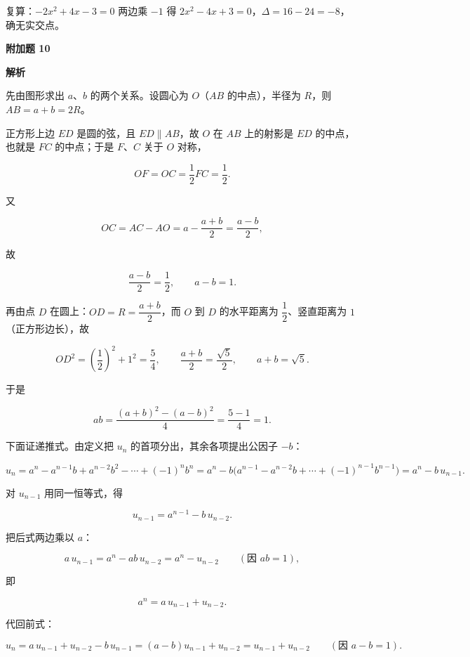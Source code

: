 \begin{answer}
复算：$-2x^2+4x-3=0$ 两边乘 $-1$ 得 $2x^2-4x+3=0$，$\Delta=16-24=-8$，确无实交点。

\textbf{附加题 10}

\textbf{解析}

先由图形求出 $a$、$b$ 的两个关系。设圆心为 $O$（$AB$ 的中点），半径为 $R$，则 $AB=a+b=2R$。

正方形上边 $ED$ 是圆的弦，且 $ED\parallel AB$，故 $O$ 在 $AB$ 上的射影是 $ED$ 的中点，也就是 $FC$ 的中点；于是 $F$、$C$ 关于 $O$ 对称，

\nopagebreak[4]
\[
OF=OC=\frac12 FC=\frac12.
\]

又

\nopagebreak[4]
\[
OC=AC-AO=a-\frac{a+b}{2}=\frac{a-b}{2},
\]

故

\nopagebreak[4]
\[
\frac{a-b}{2}=\frac12,\qquad a-b=1.
\]

再由点 $D$ 在圆上：$OD=R=\dfrac{a+b}{2}$，而 $O$ 到 $D$ 的水平距离为 $\dfrac12$、竖直距离为 $1$（正方形边长），故

\nopagebreak[4]
\[
OD^2=\left(\frac12\right)^2+1^2=\frac54,
\qquad
\frac{a+b}{2}=\frac{\sqrt5}{2},
\qquad
a+b=\sqrt5.
\]

于是

\nopagebreak[4]
\[
ab=\frac{(a+b)^2-(a-b)^2}{4}=\frac{5-1}{4}=1.
\]

下面证递推式。由定义把 $u_n$ 的首项分出，其余各项提出公因子 $-b$：

\nopagebreak[4]
\[
u_n=a^n-a^{n-1}b+a^{n-2}b^2-\cdots+(-1)^n b^n
=a^n-b\bigl(a^{n-1}-a^{n-2}b+\cdots+(-1)^{n-1}b^{n-1}\bigr)
=a^n-b\,u_{n-1}.
\]

对 $u_{n-1}$ 用同一恒等式，得

\nopagebreak[4]
\[
u_{n-1}=a^{n-1}-b\,u_{n-2}.
\]

把后式两边乘以 $a$：

\nopagebreak[4]
\[
a\,u_{n-1}=a^n-ab\,u_{n-2}=a^n-u_{n-2}
\qquad(\text{因 }ab=1),
\]

即

\nopagebreak[4]
\[
a^n=a\,u_{n-1}+u_{n-2}.
\]

代回前式：

\nopagebreak[4]
\[
u_n=a\,u_{n-1}+u_{n-2}-b\,u_{n-1}
=(a-b)u_{n-1}+u_{n-2}
=u_{n-1}+u_{n-2}
\qquad(\text{因 }a-b=1).
\]


\end{answer}

